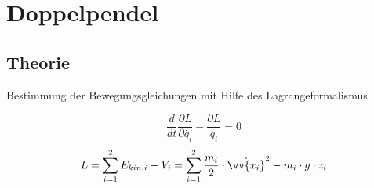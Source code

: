 \section{Doppelpendel}
\subsection{Theorie}
\begin{frame}{Bestimmung der Bewegungsgleichungen mit Hilfe des Lagrangeformalismus}
	\begin{block}
		
		\begin{equation}
			\frac{d}{dt}\frac{\partial L}{\partial\dot{q_i}}-\frac{\partial L}{q_i} =0
		\label{lagrangegl}
		\end{equation}
		\begin{equation}
			 L=\sum_{i=1}^2 E_{kin,i}-V_i=\sum_{i=1}^2 \frac{m_i}{2}\cdot\dot{\vv{x_i}}^2 - m_i \cdot g \cdot z_i
		\end{equation}
	\end{block}
\end{frame}
